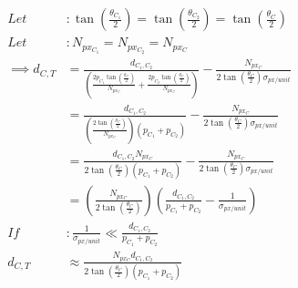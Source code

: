 \documentclass{article}
\begin{document}
	\begin{align}
		Let &: \tan \left(\frac{\theta_{C_{1}}}{2}\right) = \tan \left(\frac{\theta_{C_{2}}}{2}\right) = \tan \left(\frac{\theta_{C}}{2}\right) \\
		Let &: N_{px_{C_{1}}} = N_{px_{C_{2}}} = N_{px_{C}} \\
		\implies d_{C, T} &= \frac{d_{C_{1}, C_{2}}}{\left(\frac{2 p_{C_{1}} \tan \left(\frac{\theta_{C}}{2}\right)}{N_{px_{C}}} + \frac{2 p_{C_{2}} \tan \left(\frac{\theta_{C}}{2}\right)}{N_{px_{C}}}\right)} - \frac{N_{px_{C}}}{2 \tan \left(\frac{\theta_{C}}{2}\right) \sigma_{px / unit}} \\
		&= \frac{d_{C_{1}, C_{2}}}{\left(\frac{2 \tan \left(\frac{\theta_{C}}{2}\right)}{N_{px_{C}}}\right) \left(p_{C_{1}} + p_{C_{2}}\right)} - \frac{N_{px_{C}}}{2 \tan \left(\frac{\theta_{C}}{2}\right) \sigma_{px / unit}} \\
		&= \frac{d_{C_{1}, C_{2}} N_{px_{C}}}{2 \tan \left(\frac{\theta_{C}}{2}\right) \left(p_{C_{1}} + p_{C_{2}}\right)} - \frac{N_{px_{C}}}{2 \tan \left(\frac{\theta_{C}}{2}\right) \sigma_{px / unit}} \\
		&= \left(\frac{N_{px_{C}}}{2 \tan \left(\frac{\theta_{C}}{2}\right)}\right) \left(\frac{d_{C_{1}, C_{2}}}{p_{C_{1}} + p_{C_{2}}} - \frac{1}{\sigma_{px / unit}}\right) \\
		If &: \frac{1}{\sigma_{px/unit}} \ll \frac{d_{C_{1}, C_{2}}}{p_{C_{1}} + p_{C_{2}}} \\
		d_{C, T} &\approx \frac{N_{px_{C}} d_{C_{1}, C_{2}}}{2 \tan \left(\frac{\theta_{C}}{2}\right) \left(p_{C_{1}} + p_{C_{2}}\right)}
	\end{align}
	
\end{document}

